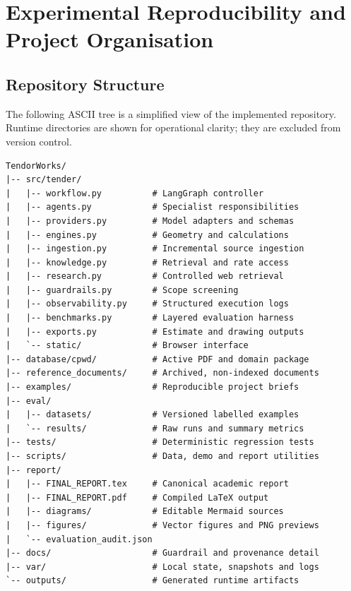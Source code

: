 \documentclass[11pt,a4paper]{article}
\begin{document}
\section{Experimental Reproducibility and Project Organisation}
\subsection{Repository Structure}
The following ASCII tree is a simplified view of the implemented repository. Runtime directories are shown for operational clarity; they are excluded from version control.
\begin{Verbatim}[fontsize=\small]
TendorWorks/
|-- src/tender/
|   |-- workflow.py          # LangGraph controller
|   |-- agents.py            # Specialist responsibilities
|   |-- providers.py         # Model adapters and schemas
|   |-- engines.py           # Geometry and calculations
|   |-- ingestion.py         # Incremental source ingestion
|   |-- knowledge.py         # Retrieval and rate access
|   |-- research.py          # Controlled web retrieval
|   |-- guardrails.py        # Scope screening
|   |-- observability.py     # Structured execution logs
|   |-- benchmarks.py        # Layered evaluation harness
|   |-- exports.py           # Estimate and drawing outputs
|   `-- static/              # Browser interface
|-- database/cpwd/           # Active PDF and domain package
|-- reference_documents/     # Archived, non-indexed documents
|-- examples/                # Reproducible project briefs
|-- eval/
|   |-- datasets/            # Versioned labelled examples
|   `-- results/             # Raw runs and summary metrics
|-- tests/                   # Deterministic regression tests
|-- scripts/                 # Data, demo and report utilities
|-- report/
|   |-- FINAL_REPORT.tex     # Canonical academic report
|   |-- FINAL_REPORT.pdf     # Compiled LaTeX output
|   |-- diagrams/            # Editable Mermaid sources
|   |-- figures/             # Vector figures and PNG previews
|   `-- evaluation_audit.json
|-- docs/                    # Guardrail and provenance detail
|-- var/                     # Local state, snapshots and logs
`-- outputs/                 # Generated runtime artifacts
\end{Verbatim}
\end{document}
